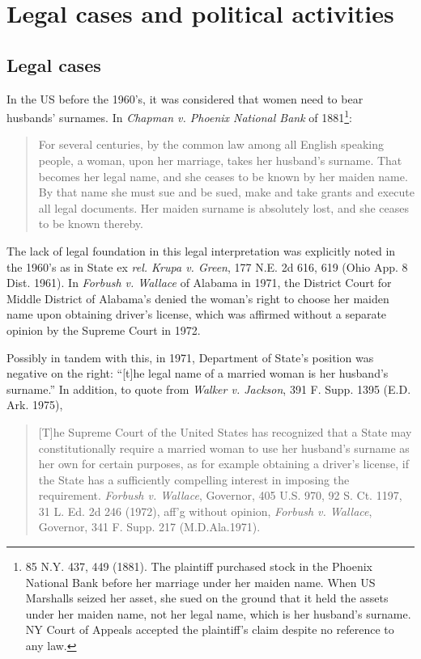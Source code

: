 \section{Legal cases and political activities}

\subsection{Legal cases}



In the US before the 1960's, it was considered that women need to bear husbands' surnames. In \textit{Chapman v. Phoenix National Bank} of 1881\footnote{85 N.Y. 437, 449 (1881). The plaintiff purchased stock in the Phoenix National Bank before her marriage under her maiden name. When US Marshalls seized her asset, she sued on the ground that it held the assets under her maiden name, not her legal name, which is her husband's surname. NY Court of Appeals accepted the plaintiff's claim despite no reference to any law. }: 
\begin{quotation}
For several centuries, by the common law among all English speaking people, a woman, upon her marriage, takes her husband's surname. That becomes her legal name, and she ceases to be known by her maiden name. By that name she must sue and be sued, make and take grants and execute all legal documents. Her maiden surname is absolutely lost, and she ceases to be known thereby. 
\end{quotation}
The lack of legal foundation in this legal interpretation was explicitly noted in the 1960's as in State ex \textit{rel. Krupa v. Green}, 177 N.E. 2d 616, 619 (Ohio App. 8 Dist. 1961). In \textit{Forbush v. Wallace} of Alabama in 1971, the District Court for Middle District of Alabama's denied the woman's right to choose her maiden name upon obtaining driver's license, which was affirmed without a separate opinion by the Supreme Court in 1972. 

Possibly in tandem with this, in 1971, Department of State's position was negative on the right: ``[t]he legal name of a married woman is her husband's surname.'' In addition, to quote from \textit{Walker v. Jackson}, 391 F. Supp. 1395 (E.D. Ark. 1975), 
\begin{quotation}
[T]he Supreme Court of the United States has recognized that a State may constitutionally require a married woman to use her husband's surname as her own for certain purposes, as for example obtaining a driver's license, if the State has a sufficiently compelling interest in imposing the requirement. \textit{Forbush v. Wallace}, Governor, 405 U.S. 970, 92 S. Ct. 1197, 31 L. Ed. 2d 246 (1972), aff'g without opinion, \textit{Forbush v. Wallace}, Governor, 341 F. Supp. 217 (M.D.Ala.1971).
\end{quotation}


